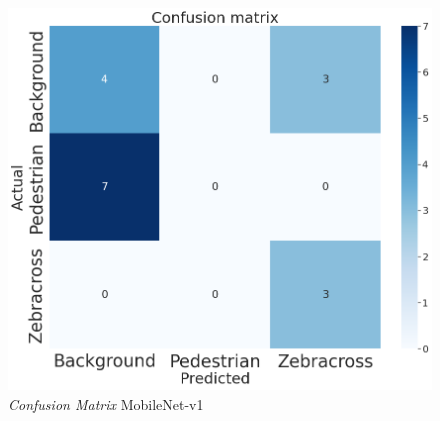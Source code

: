 \begin{figure}[H]
	\centering
	\includegraphics[scale=0.3]{gambar/confmatrix/mobilenetv1_confmat.png}
	\caption{\textit{Confusion Matrix} MobileNet-v1}
	\label{fig:confmatrix-mobilenetv1}
\end{figure}